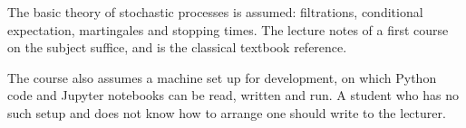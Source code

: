 The basic theory of stochastic processes is assumed:
filtrations, conditional expectation, martingales and stopping times.
The lecture notes of a first course on the subject suffice,
and \cite{Wil91pro} is the classical textbook reference.

The course also assumes a machine set up for development,
on which Python code and Jupyter notebooks can be read, written and run.
A student who has no such setup and does not know how to arrange one
should write to the lecturer.

